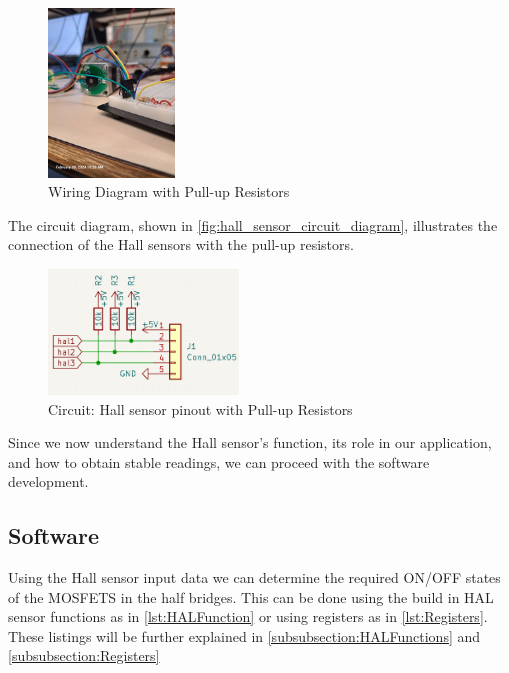\begin{figure}[H]
    \centering
    \includegraphics[width=0.3\textwidth]{img/Testing_Hallsensor_8-2-2024/Pictures/pull-up-resistor-breadboard-and-hall-sensor2.jpg}
    \caption{Wiring Diagram with Pull-up Resistors}
    \label{fig:hall_sensor_wiring_diagram}
\end{figure}

The circuit diagram, shown in \autoref{fig:hall_sensor_circuit_diagram}, illustrates the connection of the Hall sensors with the pull-up resistors.

\begin{figure}[H]
    \centering
    \includegraphics[width=0.45\textwidth]{img/Testing_Hallsensor_8-2-2024/Circuit/hall_sensor_circuit.png}
    \caption{Circuit: Hall sensor pinout with Pull-up Resistors}
    \label{fig:hall_sensor_circuit_diagram}
\end{figure}

Since we now understand the Hall sensor's function, its role in our application, and how to obtain stable readings, we can proceed with the software development.

\subsection{Software}
Using the Hall sensor input data we can determine the required ON/OFF states of the MOSFETS in the half bridges. This can be done using the build in HAL sensor functions as in \autoref{lst:HALFunction} or using registers as in \autoref{lst:Registers}. These listings will be further explained in \autoref{subsubsection:HALFunctions} and \autoref{subsubsection:Registers} 

